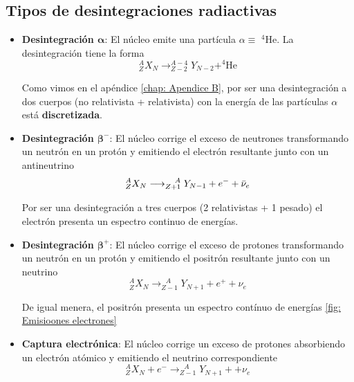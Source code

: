 \subsection{Tipos de desintegraciones radiactivas} \label{sec: Tipos de desintegraciones radiactivas}
\begin{itemize}
    \item \textbf{Desintegración $\bm{\alpha}$}: El núcleo emite una partícula $\alpha\equiv\, ^{\ 4}\mathrm{He}$. La desintegración tiene la forma 
    \begin{equation*}
        ^A _Z X_N \longrightarrow ^{A-4} _{Z-2} Y_{N-2}+ ^4\mathrm{He}
    \end{equation*}
        
    Como vimos en el apéndice \ref{chap: Apendice B}, por ser una desintegración a dos cuerpos (no relativista + relativista) con la energía de las partículas $\alpha$ está \textbf{discretizada}.
    \item \textbf{Desintegración $\bm{\beta^-}$}: El núcleo corrige el exceso de neutrones transformando un neutrón en un protón y emitiendo el electrón resultante junto con un antineutrino
    \begin{equation*}
        ^A _Z X_N \longrightarrow ^{\ \ \ A} _{Z+1} Y_{N-1}+ e^-+\Bar{\nu}_e
    \end{equation*}

        Por ser una desintegración a tres cuerpos (2 relativistas + 1 pesado) el electrón presenta un espectro continuo de energías.

    \item \textbf{Desintegración $\bm{\beta^+}$}:  El núcleo corrige el exceso de protones transformando un neutrón en un protón y emitiendo el positrón resultante junto con un neutrino
    \begin{equation*}
        ^A _Z X_N \longrightarrow ^{\ \ \ A} _{Z-1} Y_{N+1}+ e^++{\nu}_e
    \end{equation*}

    De igual menera, el positrón presenta un espectro contínuo de energías \ref{fig: Emisioones electrones}

    \item \textbf{Captura electrónica}: El núcleo corrige un exceso de protones absorbiendo un electrón atómico y emitiendo el neutrino correspondiente
    \begin{equation*}
        ^A _Z X_N +e^- \longrightarrow ^{\ \ \ A} _{Z-1} Y_{N+1}++{\nu}_e
    \end{equation*}


\end{itemize}
